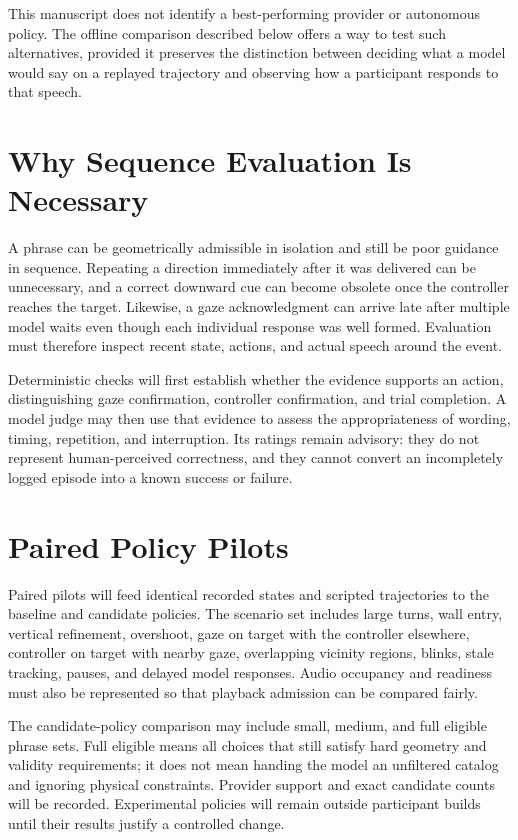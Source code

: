 This manuscript does not identify a best-performing provider or autonomous policy. The offline comparison described below offers a way to test such alternatives, provided it preserves the distinction between deciding what a model would say on a replayed trajectory and observing how a participant responds to that speech.

\section{Why Sequence Evaluation Is Necessary}
A phrase can be geometrically admissible in isolation and still be poor guidance in sequence. Repeating a direction immediately after it was delivered can be unnecessary, and a correct downward cue can become obsolete once the controller reaches the target. Likewise, a gaze acknowledgment can arrive late after multiple model waits even though each individual response was well formed. Evaluation must therefore inspect recent state, actions, and actual speech around the event.

Deterministic checks will first establish whether the evidence supports an action, distinguishing gaze confirmation, controller confirmation, and trial completion. A model judge may then use that evidence to assess the appropriateness of wording, timing, repetition, and interruption. Its ratings remain advisory: they do not represent human-perceived correctness, and they cannot convert an incompletely logged episode into a known success or failure.

\section{Paired Policy Pilots}
Paired pilots will feed identical recorded states and scripted trajectories to the baseline and candidate policies. The scenario set includes large turns, wall entry, vertical refinement, overshoot, gaze on target with the controller elsewhere, controller on target with nearby gaze, overlapping vicinity regions, blinks, stale tracking, pauses, and delayed model responses. Audio occupancy and readiness must also be represented so that playback admission can be compared fairly.

The candidate-policy comparison may include small, medium, and full eligible phrase sets. Full eligible means all choices that still satisfy hard geometry and validity requirements; it does not mean handing the model an unfiltered catalog and ignoring physical constraints. Provider support and exact candidate counts will be recorded. Experimental policies will remain outside participant builds until their results justify a controlled change.

